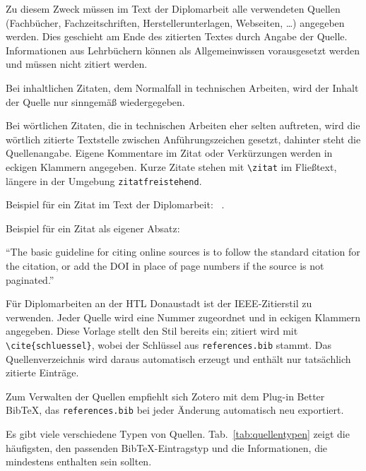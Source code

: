 Zu diesem Zweck müssen im Text der Diplomarbeit alle verwendeten Quellen
(Fachbücher, Fachzeitschriften, Herstellerunterlagen, Webseiten, \ldots)
angegeben werden. Dies geschieht am Ende des zitierten Textes durch Angabe
der Quelle. Informationen aus Lehrbüchern können als Allgemeinwissen
vorausgesetzt werden und müssen nicht zitiert werden.

Bei inhaltlichen Zitaten, dem Normalfall in technischen Arbeiten, wird der
Inhalt der Quelle nur sinngemäß wiedergegeben.

Bei wörtlichen Zitaten, die in technischen Arbeiten eher selten auftreten,
wird die wörtlich zitierte Textstelle zwischen Anführungszeichen gesetzt,
dahinter steht die Quellenangabe. Eigene Kommentare im Zitat oder
Verkürzungen werden in eckigen Klammern angegeben. Kurze Zitate stehen mit
\lstinline|\zitat| im Fließtext, längere in der Umgebung
\lstinline|zitatfreistehend|.

Beispiel für ein Zitat im Text der Diplomarbeit:
~\cite{beispiel-buch}.

Beispiel für ein Zitat als eigener Absatz:

\begin{zitatfreistehend}
  \enquote{The basic guideline for citing online sources is to follow the
  standard citation for the citation, or add the DOI in place of page
  numbers if the source is not paginated.}~\cite{beispiel-artikel}
\end{zitatfreistehend}

Für Diplomarbeiten an der \ac{HTL} Donaustadt ist der IEEE-Zitierstil zu
verwenden. Jeder Quelle wird eine Nummer zugeordnet und in eckigen Klammern
angegeben. Diese Vorlage stellt den Stil bereits ein; zitiert wird mit
\lstinline|\cite{schluessel}|, wobei der Schlüssel aus
\lstinline|references.bib| stammt. Das Quellenverzeichnis wird daraus
automatisch erzeugt und enthält nur tatsächlich zitierte Einträge.

Zum Verwalten der Quellen empfiehlt sich Zotero mit dem Plug-in Better
BibTeX, das \lstinline|references.bib| bei jeder Änderung automatisch neu
exportiert.

Es gibt viele verschiedene Typen von Quellen. Tab.~\ref{tab:quellentypen}
zeigt die häufigsten, den passenden BibTeX-Eintragstyp und die
Informationen, die mindestens enthalten sein sollten.

